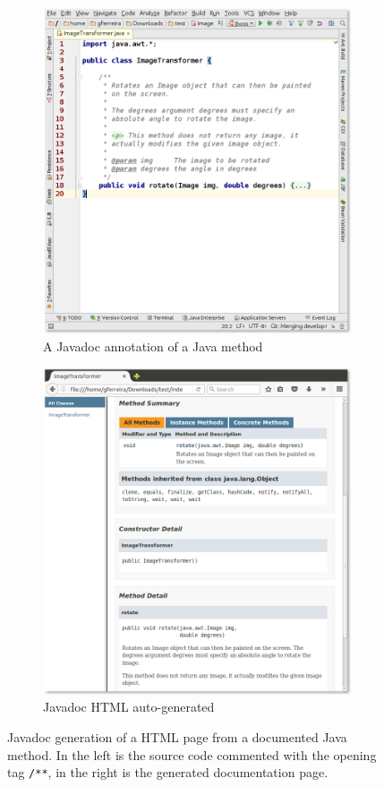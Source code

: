 \begin{figure}[h]
\centering
\begin{subfigure}{.5\textwidth}
  \centering
  \includegraphics[width=.9\linewidth]{images/javadoc-code}
  \caption{A Javadoc annotation of a Java method}
  \label{fig:javadoc-code}
\end{subfigure}%
\begin{subfigure}{.5\textwidth}
  \centering
  \includegraphics[width=.9\linewidth]{images/javadoc}
  \caption{Javadoc HTML auto-generated}
  \label{fig:javadocgen}
\end{subfigure}
\caption{Javadoc generation of a HTML page from a documented Java method. In the left is the source code commented with the opening tag \texttt{/**}, in the right is the generated documentation page.}
\label{fig:javadoc}
\end{figure}

